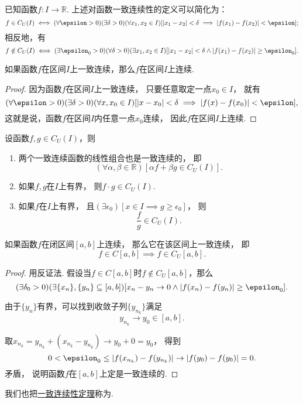 已知函数\(f\colon I\to\mathbb{R}\).
上述对函数一致连续性的定义可以简化为：\[
	f \in C_U(I)
	\iff
	(\forall\epsilon>0)
	(\exists\delta>0)
	(\forall x_1,x_2 \in I)
	[
		\abs{x_1 - x_2} < \delta
		\implies
		\abs{f(x_1) - f(x_2)} < \epsilon
	];
\]
相反地，有\[
	f \notin C_U(I)
	\iff
	(\exists\epsilon_0>0)
	(\forall\delta>0)
	(\exists x_1,x_2 \in I)
	[
		\abs{x_1-x_2}<\delta
		\land
		\abs{f(x_1)-f(x_2)}\geq\epsilon_0
	].
\]

\begin{theorem}\label{theorem:极限.闭区间上连续函数的性质.一致连续函数一定连续}
如果函数\(f\)在区间\(I\)上一致连续，那么\(f\)在区间\(I\)上连续.
\begin{proof}
因为函数\(f\)在区间\(I\)上一致连续，
只要任意取定一点\(x_0 \in I\)，
就有\[
	(\forall \epsilon > 0)
	(\exists \delta > 0)
	(\forall x,x_0 \in I)
	[
		\abs{x-x_0} < \delta
		\implies
		\abs{f(x)-f(x_0)} < \epsilon
	],
\]
这就是说，函数\(f\)在区间\(I\)内任意一点\(x_0\)连续，
因此\(f\)在区间\(I\)上连续.
\end{proof}
\end{theorem}

\begin{theorem}[一致连续函数的四则运算法则]\label{theorem:极限.闭区间上连续函数的性质.一致连续函数的四则运算法则}
设函数\(f,g \in C_U(I)\)，则
\begin{enumerate}
	\item 两个一致连续函数的线性组合也是一致连续的，
	即\[
		(\forall\alpha,\beta\in\mathbb{R})
		[\alpha f + \beta g \in C_U(I)].
	\]

	\item 如果\(f,g\)在\(I\)上有界，
	则\(f \cdot g \in C_U(I)\).

	\item 如果\(f\)在\(I\)上有界，
	且\((\exists\epsilon_0)
	[x \in I \implies g \geq \epsilon_0]\)，
	则\[
		\frac{f}{g} \in C_U(I).
	\]
\end{enumerate}
\end{theorem}

\begin{theorem}[一致连续性定理]\label{theorem:极限.一致连续性定理}
如果函数\(f\)在闭区间\([a,b]\)上连续，
那么它在该区间上一致连续，
即\[
	f \in C[a,b]
	\implies
	f \in C_U[a,b].
\]
\begin{proof}
用反证法.
假设当\(f \in C[a,b]\)时\(f \notin C_U[a,b]\)，那么\[
	(\exists\delta_0>0)
	(\exists\{x_n\},\{y_n\}\subseteq[a,b])
	[
		x_n-y_n\to0
		\land
		\abs{f(x_n)-f(y_n)}\geq\epsilon_0
	].
\]

由于\(\{y_n\}\)有界，可以找到收敛子列\(\{y_{n_k}\}\)满足\[
	y_{n_k} \to y_0\in[a,b].
\]

取\(x_{n_k} = y_{n_k} + (x_{n_k} - y_{n_k})
\to y_0 + 0 = y_0\)，
得到\[
	0 < \epsilon_0 \leq \abs{f(x_{n_k})-f(y_{n_k})}
	\to \abs{f(y_0)-f(y_0)} = 0.
\]矛盾，
说明函数\(f\)在\([a,b]\)上定是一致连续的.
\end{proof}
\end{theorem}
我们也把\hyperref[theorem:极限.一致连续性定理]{一致连续性定理}称为.

